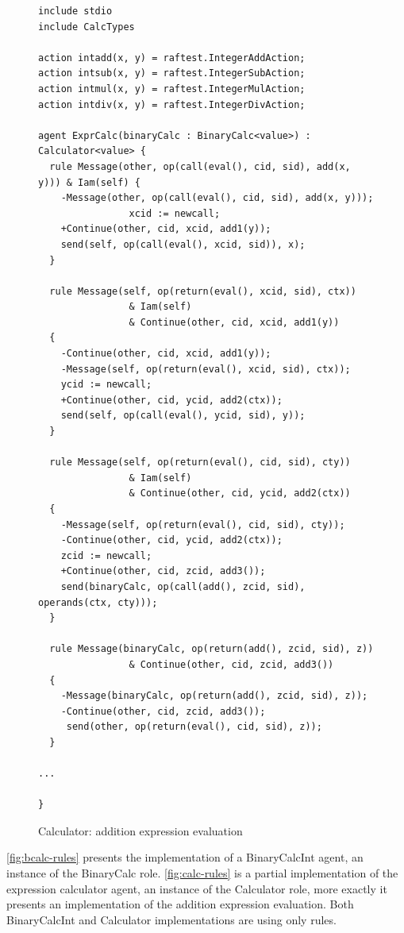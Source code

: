 \documentclass[a4paper,12pt,oneside,fleqn]{book} %
\begin{document}
\begin{figure}\footnotesize %
\begin{verbatim}
include stdio
include CalcTypes

action intadd(x, y) = raftest.IntegerAddAction;
action intsub(x, y) = raftest.IntegerSubAction;
action intmul(x, y) = raftest.IntegerMulAction;
action intdiv(x, y) = raftest.IntegerDivAction;

agent ExprCalc(binaryCalc : BinaryCalc<value>) : Calculator<value> {
  rule Message(other, op(call(eval(), cid, sid), add(x, y))) & Iam(self) {
    -Message(other, op(call(eval(), cid, sid), add(x, y)));
                xcid := newcall;
    +Continue(other, cid, xcid, add1(y));
    send(self, op(call(eval(), xcid, sid)), x);
  }

  rule Message(self, op(return(eval(), xcid, sid), ctx))
                & Iam(self)
                & Continue(other, cid, xcid, add1(y))
  {
    -Continue(other, cid, xcid, add1(y));
    -Message(self, op(return(eval(), xcid, sid), ctx));
    ycid := newcall;
    +Continue(other, cid, ycid, add2(ctx));
    send(self, op(call(eval(), ycid, sid), y));
  }

  rule Message(self, op(return(eval(), cid, sid), cty))
                & Iam(self)
                & Continue(other, cid, ycid, add2(ctx))
  {
    -Message(self, op(return(eval(), cid, sid), cty));
    -Continue(other, cid, ycid, add2(ctx));
    zcid := newcall;
    +Continue(other, cid, zcid, add3());
    send(binaryCalc, op(call(add(), zcid, sid), operands(ctx, cty)));
  }

  rule Message(binaryCalc, op(return(add(), zcid, sid), z))
                & Continue(other, cid, zcid, add3())
  {
    -Message(binaryCalc, op(return(add(), zcid, sid), z));
    -Continue(other, cid, zcid, add3());
     send(other, op(return(eval(), cid, sid), z));
  }

...

}

\end{verbatim}
\caption{Calculator: addition expression evaluation}
\label{fig:calc-rules}
\end{figure} %

\autoref{fig:bcalc-rules} presents the implementation of a BinaryCalcInt
agent, an instance of the BinaryCalc role.  \autoref{fig:calc-rules} is
a partial implementation of the expression calculator agent, an instance of
the Calculator role, more exactly it presents an implementation of the
addition expression evaluation. Both BinaryCalcInt and Calculator
implementations are using only rules.
\end{document}
